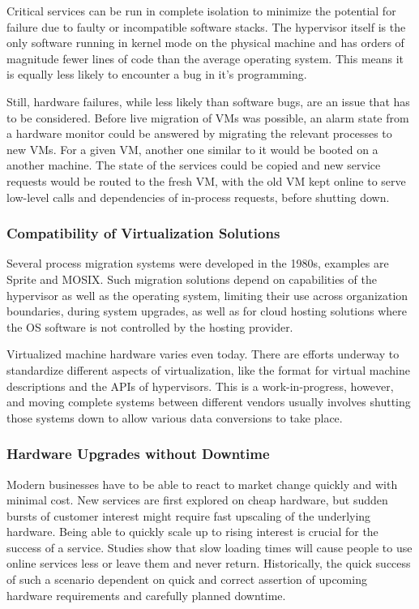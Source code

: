 \documentclass[a4paper]{IEEEtran}
\begin{document}
Critical services can be run in complete isolation to minimize the
potential for failure due to faulty or incompatible software
stacks. The hypervisor itself is the only software running in kernel
mode on the physical machine and has orders of magnitude fewer lines
of code than the average operating system. This means it is equally
less likely to encounter a bug in it's programming.

Still, hardware failures, while less likely than software bugs, are an
issue that has to be considered. Before live migration of VMs was
possible, an alarm state from a hardware monitor could be answered by
migrating the relevant processes to new VMs\cite{hansen2004self}. For
a given VM, another one similar to it would be booted on a another
machine. The state of the services could be copied and new service
requests would be routed to the fresh VM, with the old VM kept online
to serve low-level calls and dependencies of in-process requests,
before shutting down\cite{clark2005live}.

\subsubsection{Compatibility of Virtualization Solutions}
Several process migration systems were developed in the 1980s,
examples are Sprite and MOSIX\cite{hansen2004self}. Such migration
solutions depend on capabilities of the hypervisor as well as the
operating system, limiting their use across organization boundaries,
during system upgrades, as well as for cloud hosting solutions where
the OS software is not controlled by the hosting provider.

Virtualized machine hardware varies even today. There are efforts
underway\cite{cloudstandard} to standardize different aspects of
virtualization, like the format for virtual machine descriptions and
the APIs of hypervisors. This is a work-in-progress, however, and
moving complete systems between different vendors usually involves
shutting those systems down to allow various data conversions to take
place.

\subsubsection{Hardware Upgrades without Downtime}
Modern businesses have to be able to react to market change quickly
and with minimal cost. New services are first explored on cheap
hardware\cite{tanenbaum1992modern}, but sudden bursts of customer
interest might require fast upscaling of the underlying
hardware. Being able to quickly scale up to rising interest is crucial
for the success of a service. Studies show that slow loading times
will cause people to use online services less or leave them and never
return\cite{kohavi2007online}. Historically, the quick success of such
a scenario dependent on quick and correct assertion of upcoming
hardware requirements and carefully planned downtime.
\end{document}
